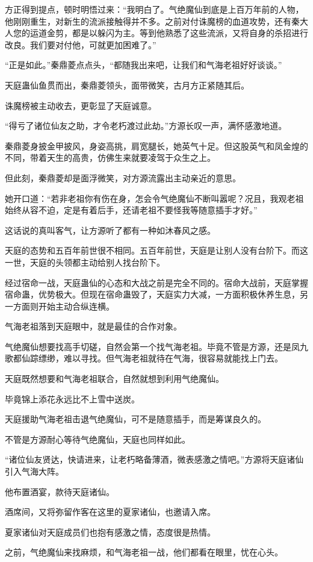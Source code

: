 \begin{this_body}
方正得到提点，顿时明悟过来：“我明白了。气绝魔仙到底是上百万年前的人物，他刚刚重生，对新生的流派接触得并不多。之前对付诛魔榜的血道攻势，还有秦大人您的运道金剪，都是以躲闪为主。等到他熟悉了这些流派，又将自身的杀招进行改良。我们要对付他，可就更加困难了。”

“正是如此。”秦鼎菱点点头，“都随我出来吧，让我们和气海老祖好好谈谈。”

天庭蛊仙鱼贯而出，秦鼎菱领头，面带微笑，古月方正紧随其后。

诛魔榜被主动收去，更彰显了天庭诚意。

“得亏了诸位仙友之助，才令老朽渡过此劫。”方源长叹一声，满怀感激地道。

秦鼎菱身披金甲披风，身姿高挑，肩宽腿长，她英气十足。但这股英气和凤金煌的不同，带着天生的高贵，仿佛生来就要凌驾于众生之上。

但此刻，秦鼎菱却是面浮微笑，对方源流露出主动亲近的意思。

她开口道：“若非老祖你有伤在身，怎会令气绝魔仙不断叫嚣呢？况且，我观老祖始终从容不迫，定是有着后手，还请老祖不要怪我等随意插手才好。”

这话说的真叫客气，让方源听了都有一种如沐春风之感。

天庭的态势和五百年前世很不相同。五百年前世，天庭是让别人没有台阶下。而这一世，天庭的头领都主动给别人找台阶下。

经过宿命一战，天庭蛊仙的心态和大战之前是完全不同的。宿命大战前，天庭掌握宿命蛊，优势极大。但现在宿命蛊毁了，天庭实力大减，一方面积极休养生息，另一方面则开始主动合纵连横。

气海老祖落到天庭眼中，就是最佳的合作对象。

气绝魔仙想要找高手切磋，自然会第一个找气海老祖。毕竟不管是方源，还是凤九歌都仙踪缥缈，难以寻找。但气海老祖就待在气海，很容易就能找上门去。

天庭既然想要和气海老祖联合，自然就想到利用气绝魔仙。

毕竟锦上添花永远比不上雪中送炭。

天庭援助气海老祖击退气绝魔仙，可不是随意插手，而是筹谋良久的。

不管是方源耐心等待气绝魔仙，天庭也同样如此。

“诸位仙友贤达，快请进来，让老朽略备薄酒，微表感激之情吧。”方源将天庭诸仙引入气海大阵。

他布置酒宴，款待天庭诸仙。

酒席间，又将弥留作客在这里的夏家诸仙，也邀请入席。

夏家诸仙对天庭成员们也抱有感激之情，态度很是热情。

之前，气绝魔仙来找麻烦，和气海老祖一战，他们都看在眼里，忧在心头。


\end{this_body}
